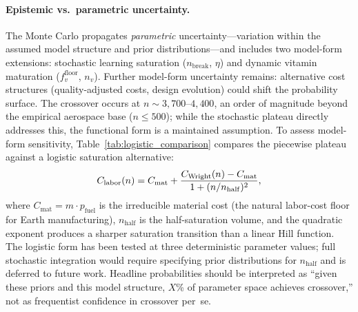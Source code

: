 \documentclass[5p,twocolumn]{elsarticle}
\begin{document}
\paragraph{Epistemic vs.\ parametric uncertainty.} The Monte Carlo propagates \emph{parametric} uncertainty---variation within the assumed model structure and prior distributions---and includes two model-form extensions: stochastic learning saturation ($n_{\mathrm{break}}$, $\eta$) and dynamic vitamin maturation ($f_v^{\mathrm{floor}}$, $n_v$). Further model-form uncertainty remains: alternative cost structures (quality-adjusted costs, design evolution) could shift the probability surface. The crossover occurs at $n \sim 3{,}700$--$4{,}400$, an order of magnitude beyond the empirical aerospace base ($n \leq 500$); while the stochastic plateau directly addresses this, the functional form is a maintained assumption. To assess model-form sensitivity, Table~\ref{tab:logistic_comparison} compares the piecewise plateau against a logistic saturation alternative:
\begin{equation}\small
  C_{\mathrm{labor}}(n) = C_{\mathrm{mat}} + \frac{C_{\mathrm{Wright}}(n) - C_{\mathrm{mat}}}{1 + (n/n_{\mathrm{half}})^2},
  \label{eq:logistic_saturation}
\end{equation}
where $C_{\mathrm{mat}} = m \cdot p_{\mathrm{fuel}}$ is the irreducible material cost (the natural labor-cost floor for Earth manufacturing), $n_{\mathrm{half}}$ is the half-saturation volume, and the quadratic exponent produces a sharper saturation transition than a linear Hill function. The logistic form has been tested at three deterministic parameter values; full stochastic integration would require specifying prior distributions for $n_{\mathrm{half}}$ and is deferred to future work. Headline probabilities should be interpreted as ``given these priors and this model structure, $X$\% of parameter space achieves crossover,'' not as frequentist confidence in crossover per~se.

\begin{table}[htbp]
\centering
\caption{Learning curve model-form sensitivity (deterministic, $r = 5\%$, phased $K$). ``Plateau'' = piecewise damped exponent; ``Logistic'' = smooth saturation at $n_{\mathrm{half}}$. Pure Wright (no saturation) yields $N^* = 3{,}749$.}
\label{tab:logistic_comparison}
\small
{}
\end{table}
\end{document}
